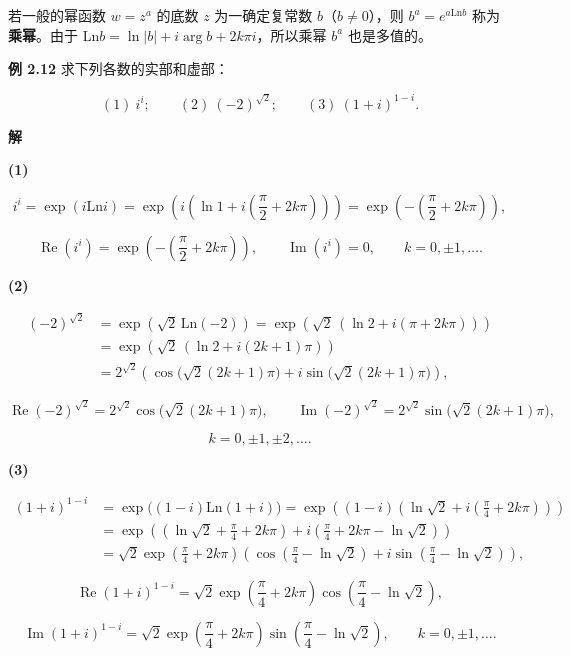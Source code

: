 若一般的幂函数 \(w=z^a\) 的底数 \(z\) 为一确定复常数
\(b\)（\(b\neq0\)），则 \(b^a=e^{a\mathrm{Ln}b}\)
称为\textbf{乘幂}。由于
\(\mathrm{Ln}b=\ln|b|+i\arg b+2k\pi i\)，所以乘幂 \(b^a\) 也是多值的。

\textbf{例 2.12} 求下列各数的实部和虚部：

\[
(1)\ i^i;\qquad (2)\ (-2)^{\sqrt2};\qquad (3)\ (1+i)^{1-i}.
\]

\textbf{解}

\textbf{(1)}

\[
i^i=\exp(i\mathrm{Ln}i)=\exp\left(i\left(\ln1+i\left(\frac{\pi}{2}+2k\pi\right)\right)\right)
=\exp\left(-\left(\frac{\pi}{2}+2k\pi\right)\right),
\]

\[
\operatorname{Re}(i^i)=\exp\left(-\left(\frac{\pi}{2}+2k\pi\right)\right),\qquad
\operatorname{Im}(i^i)=0,\qquad k=0,\pm1,\ldots .
\]

\textbf{(2)}

\[
\begin{aligned}
(-2)^{\sqrt2}
&=\exp\left(\sqrt2\,\mathrm{Ln}(-2)\right)
=\exp\left(\sqrt2\,(\ln2+i(\pi+2k\pi))\right)\\
&=\exp\left(\sqrt2\,(\ln2+i(2k+1)\pi)\right)\\
&=2^{\sqrt2}\left(\cos\bigl(\sqrt2(2k+1)\pi\bigr)+i\sin\bigl(\sqrt2(2k+1)\pi\bigr)\right),
\end{aligned}
\]

\[
\operatorname{Re}(-2)^{\sqrt2}=2^{\sqrt2}\cos\bigl(\sqrt2(2k+1)\pi\bigr),\qquad
\operatorname{Im}(-2)^{\sqrt2}=2^{\sqrt2}\sin\bigl(\sqrt2(2k+1)\pi\bigr),
\]

\[
k=0,\pm1,\pm2,\ldots .
\]

\textbf{(3)}

\[
\begin{aligned}
(1+i)^{1-i}
&=\exp\bigl((1-i)\mathrm{Ln}(1+i)\bigr)
=\exp\left((1-i)\left(\ln\sqrt2+i\left(\frac{\pi}{4}+2k\pi\right)\right)\right)\\
&=\exp\left(\left(\ln\sqrt2+\frac{\pi}{4}+2k\pi\right)
+i\left(\frac{\pi}{4}+2k\pi-\ln\sqrt2\right)\right)\\
&=\sqrt2\exp\left(\frac{\pi}{4}+2k\pi\right)
\left(\cos\left(\frac{\pi}{4}-\ln\sqrt2\right)+i\sin\left(\frac{\pi}{4}-\ln\sqrt2\right)\right),
\end{aligned}
\]

\[
\operatorname{Re}(1+i)^{1-i}
=\sqrt2\exp\left(\frac{\pi}{4}+2k\pi\right)\cos\left(\frac{\pi}{4}-\ln\sqrt2\right),
\]

\[
\operatorname{Im}(1+i)^{1-i}
=\sqrt2\exp\left(\frac{\pi}{4}+2k\pi\right)\sin\left(\frac{\pi}{4}-\ln\sqrt2\right),
\qquad k=0,\pm1,\ldots .
\]

